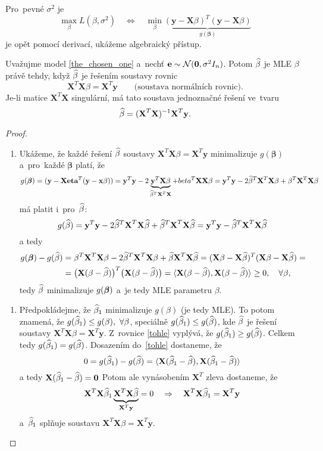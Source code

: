  Pro~pevné $\sigma^2$ je 
 $$\max_\beta L(\beta,\sigma^2)\quad\Leftrightarrow\quad\min_\beta\underbrace{(\textbf{y}-\textbf{X}\beta)^T(\textbf{y}-\textbf{X}\beta)}_{g(\boldsymbol{\beta})}$$
 je opět pomocí derivací, ukážeme algebraický přístup.
 \begin{theorem}
 	Uvažujme model \ref{the_chosen_one} a~nechť $\textbf{e}\sim\mathcal{N}(\textbf{0},\sigma^2 I_n)$. Potom $\widehat{\beta}$ je MLE $\beta$ právě tehdy, když $\widehat{\beta}$ je řešením soustavy rovnic
 	$$ \textbf{X}^T\textbf{X}\beta=\textbf{X}^T\textbf{y}\qquad\text{(soustava normálních rovnic)}.$$
 	Je-li matice $\textbf{X}^T\textbf{X}$ singulární, má tato soustava jednoznačné řešení ve~tvaru 
 	$$ \widehat{\beta}=(\textbf{X}^T\textbf{X})^{-1}\textbf{X}^T\textbf{y}.$$
 	\begin{proof}
 		\begin{enumerate}[$\Leftarrow$]
 			\item Ukážeme, že každé řešení $\widehat{\beta}$ soustavy $\textbf{X}^T\textbf{X}\beta=\textbf{X}^T\textbf{y}$ minimalizuje $g(\boldsymbol{\beta})$ a~pro~každé $\boldsymbol{\beta}$ platí, že 
 			$$ g(\boldsymbol{\beta})=(\textbf{y}-\textbf{X}\textbf{eta}^T(\textbf{y}-\textbf{x}\beta))=\textbf{y}^T\textbf{y}-2\underbrace{\textbf{y}^T\textbf{X}\beta}_{\widehat{\beta}^T\textbf{X}^T\textbf{X}}+beta^T\textbf{X}\textbf{X}\beta=\textbf{y}^T\textbf{y}-2\widehat{\beta}^T\textbf{X}^T\textbf{X}\beta+\beta^T\textbf{X}^T\textbf{X}\beta$$
 			má platit i~pro~$\widehat{\beta}$:
 			$$ g(\widehat{\beta})=\textbf{y}^T\textbf{y}-2\widehat{\beta}^T\textbf{X}^T\textbf{X}\widehat{\beta}+\widehat{\beta}^T\textbf{X}^T\textbf{X}\widehat{\beta}=\textbf{y}^T\textbf{y}-\widehat{\beta}^T\textbf{X}^T\textbf{X}\widehat{\beta}$$
 			a tedy 
 			\begin{align}
 			g(\boldsymbol{\beta})-g(\widehat{\beta})&=\beta^T\textbf{X}^T\textbf{X}\beta-2\widehat{\beta}^T\textbf{X}^T\textbf{X}\beta+\widehat{\beta}\textbf{X}^T\textbf{X}\widehat{\beta}=(\textbf{X}\beta-\textbf{X}\widehat{\beta})^T(\textbf{X}\beta-\textbf{X}\widehat{\beta})=\\&\label{tohle}=\big( \textbf{X}(\beta-\widehat{\beta}) \big)^T\big( \textbf{X}(\beta-\widehat{\beta}) \big)=\langle \textbf{X}(\beta-\widehat{\beta}),\textbf{X}(\beta-\widehat{\beta}) \rangle\geq 0,\quad\forall\beta,
 			\end{align}
 			 tedy $\widehat{\beta}$ minimalizuje $g(\boldsymbol{\beta})$ a~je tedy MLE parametru $\beta$.
 		\end{enumerate}
 	\begin{enumerate}[$\Rightarrow$]
 		\item Předpokládejme, že $\widehat{\beta}_1$ minimalizuje $g(\beta)$ (je tedy MLE). To potom znamená, že $g(\widehat{\beta}_1)\leq g(\beta),~\forall \beta$, speciálně $g(\widehat{\beta}_1)\leq g(\widehat{\beta})$, kde $\widehat{\beta}$ je řešení soustavy $\textbf{X}^T\textbf{X}\beta=\textbf{X}^T\textbf{y}$. Z~rovnice \ref{tohle} vyplývá, že $g(\widehat{\beta}_1)\geq g(\widehat{\beta})$. Celkem tedy $g(\widehat{\beta}_1)=g(\widehat{\beta})$. Dosazením do~\ref{tohle} dostaneme, že 
 		$$ 0=g(\widehat{\beta}_1)-g(\widehat{\beta})=\langle \textbf{X}(\widehat{\beta}_1-\widehat{\beta}),\textbf{X}(\widehat{\beta}_1-\widehat{\beta}) \rangle$$
 		a tedy $\textbf{X}(\widehat{\beta}_1-\widehat{\beta})=\textbf{0}$ Potom ale vynásobením $\textbf{X}^T$ zleva dostaneme, že 
 		$$ \textbf{X}^T\textbf{X}\widehat{\beta}_1\underbrace{\textbf{X}^T\textbf{X}\widehat{\beta}}_{\textbf{X}^T\textbf{y}}=0\quad\Rightarrow\quad \textbf{X}^T\textbf{X}\widehat{\beta}_1=\textbf{X}^T\textbf{y}$$
 		 a~$\widehat{\beta}_1$ splňuje soustavu $\textbf{X}^T\textbf{X}\beta=\textbf{X}^T\textbf{y}$.
 		 

\end{enumerate}
\end{proof}
\end{theorem}
